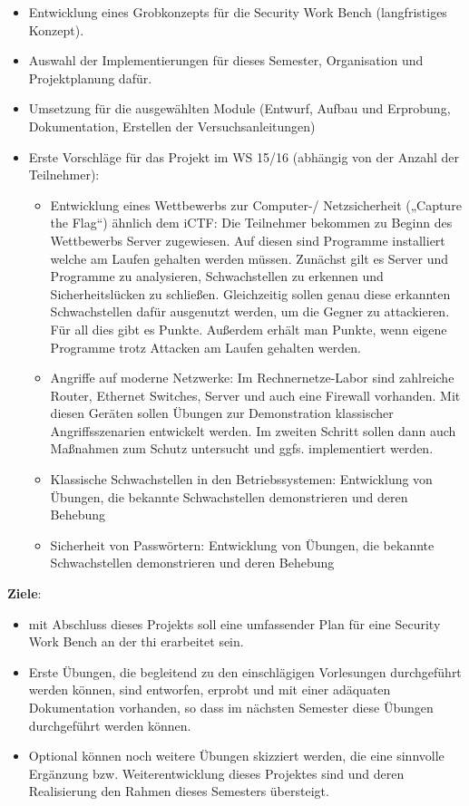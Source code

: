 \begin{itemize}
\item Entwicklung eines Grobkonzepts für die Security Work Bench (langfristiges Konzept).
\item Auswahl der Implementierungen für dieses Semester, Organisation und Projektplanung dafür.
\item Umsetzung für die ausgewählten Module (Entwurf, Aufbau und Erprobung, Dokumentation, Erstellen der Versuchsanleitungen)
\item Erste Vorschläge für das Projekt im WS 15/16 (abhängig von der Anzahl der Teilnehmer):
	\begin{itemize}
	\item Entwicklung eines Wettbewerbs zur Computer-/ Netzsicherheit („Capture the Flag“) ähnlich dem iCTF: Die Teilnehmer bekommen zu Beginn des Wettbewerbs Server zugewiesen. Auf diesen sind Programme installiert welche am Laufen gehalten werden müssen. Zunächst gilt es Server und Programme zu analysieren, Schwachstellen zu erkennen und Sicherheitslücken zu schließen. Gleichzeitig sollen genau diese erkannten Schwachstellen dafür ausgenutzt werden, um die Gegner zu attackieren. Für all dies gibt es Punkte. Außerdem erhält man Punkte, wenn eigene Programme trotz Attacken am Laufen gehalten werden.
	\item Angriffe auf moderne Netzwerke: Im Rechnernetze-Labor sind zahlreiche Router, Ethernet Switches, Server und auch eine Firewall vorhanden. Mit diesen Geräten sollen Übungen zur Demonstration klassischer Angriffsszenarien entwickelt werden. Im zweiten Schritt sollen dann auch Maßnahmen zum Schutz untersucht und ggfs. implementiert werden.
	\item Klassische Schwachstellen in den Betriebssystemen: Entwicklung von Übungen, die bekannte Schwachstellen demonstrieren und deren Behebung
	\item Sicherheit von Passwörtern: Entwicklung von Übungen, die bekannte Schwachstellen demonstrieren und deren Behebung
	\end{itemize}
\end{itemize}
\newpage
\textbf{Ziele}:\newline
\begin{itemize}
\item mit Abschluss dieses Projekts soll eine umfassender Plan für eine Security Work Bench an der thi erarbeitet sein.
\item Erste Übungen, die begleitend zu den einschlägigen Vorlesungen durchgeführt werden können, sind entworfen, erprobt und mit einer adäquaten Dokumentation vorhanden, so dass im nächsten Semester diese Übungen durchgeführt werden können.
\item Optional können noch weitere Übungen skizziert werden, die eine sinnvolle Ergänzung bzw. Weiterentwicklung dieses Projektes sind und deren Realisierung den Rahmen dieses Semesters übersteigt.
\end{itemize}